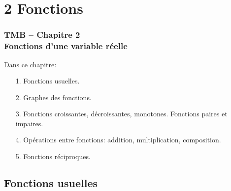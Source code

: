 %
%



\section{2 Fonctions}

\begin{frame}[plain]
\frametitle{\bf TMB -- Chapitre 2 \\ 
Fonctions d'une variable r\'eelle}

Dans ce chapitre: 
\begin{itemize}
\item[1.] Fonctions usuelles. 

\item[2.] Graphes des fonctions. 

\item[3.] Fonctions croissantes, d\'ecroissantes, monotones. 
Fonctions paires et impaires. 

\item[4.] Op\'erations entre fonctions: addition, multiplication, 
composition. 

\item[5.] Fonctions r\'eciproques. 
\end{itemize}

\end{frame}


\subsection{Fonctions usuelles} 

